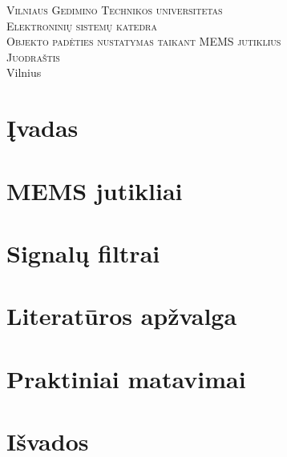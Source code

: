 \documentclass[11pt, a4paper]{article}
\begin{document}
  \begin{titlepage}
    \begin{center}
      \textsc{\LARGE Vilniaus Gedimino Technikos universitetas}\\[2mm]
      \textsc{\Large Elektroninių sistemų katedra}\\[70mm]
      \textsc{\Large Objekto padėties nustatymas taikant MEMS jutiklius}\\[60mm]
      \textsc{\Large Juodraštis}\\[60mm]
      \vfill
      {\large Vilnius \\ \the\year}
    \end{center}
  \end{titlepage}

  \tableofcontents

  \newpage

  \section{Įvadas}

  

  \section{MEMS jutikliai}

  

  \section{Signalų filtrai}

  

  \section{Literatūros apžvalga}

  

  \section{Praktiniai matavimai}

  

  \section{Išvados}

  

  \newpage

  
  
\end{document}
